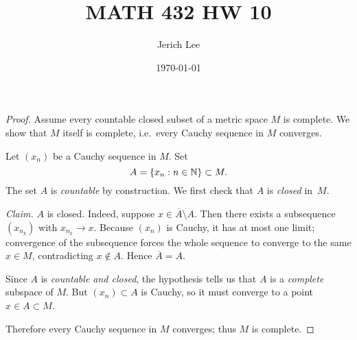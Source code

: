 \documentclass[12pt]{article}
\title{MATH 432 HW 10}
\author{Jerich Lee}
\date{\today}
\theoremstyle{definition} %
\theoremstyle{plain} %
\begin{document}
\maketitle
\begin{proof}
  Assume every countable closed subset of a metric space \(M\) is complete.
  We show that \(M\) itself is complete, i.e.\ every Cauchy sequence in
  \(M\) converges.
  
  \medskip
  Let \((x_n)\) be a Cauchy sequence in \(M\).
  Set
  \[
     A=\{x_n : n\in\Bbb N\}\subset M .
  \]
  The set \(A\) is \emph{countable} by construction.
  We first check that \(A\) is \emph{closed} in~\(M\).
  
  \smallskip
  \textit{Claim.} \(A\) is closed.  
  Indeed, suppose \(x\in\overline{A}\setminus A\).
  Then there exists a subsequence \((x_{n_k})\) with \(x_{n_k}\to x\).
  Because \((x_n)\) is Cauchy, it has at most one limit;
  convergence of the subsequence forces the whole sequence to converge to
  the same \(x\in M\), contradicting \(x\notin A\).
  Hence \(\overline{A}=A\).
  
  \smallskip
  Since \(A\) is \emph{countable and closed}, the hypothesis tells us that
  \(A\) is a \emph{complete} subspace of \(M\).
  But \((x_n)\subset A\) is Cauchy, so it must converge to a point
  \(x\in A\subset M\).
  
  \medskip
  Therefore every Cauchy sequence in \(M\) converges; thus \(M\) is
  complete.
  \end{proof}
\end{document}
